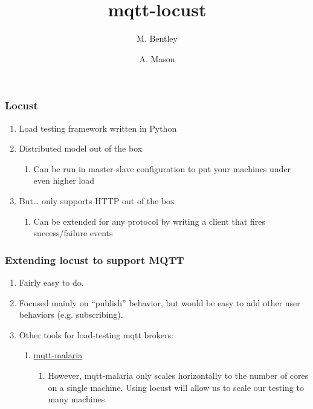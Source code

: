 \documentclass{beamer}
\title{mqtt-locust}
\author[Bentley, Mason]
{
    M. Bentley \and A. Mason\\
    \email{\{void,null\}@case.edu}
}
\institute[CWRU]{Case Western Reserve University}
\begin{document}
\frame{\titlepage}

\begin{frame}
    \frametitle{Locust}
    \begin{enumerate}
        \item Load testing framework written in Python
        \item
            Distributed model out of the box
            \begin{enumerate}
                \item Can be run in master-slave configuration to put your
                machines under even higher load
            \end{enumerate}
        \item
            But… only supports HTTP out of the box
            \begin{enumerate}
                \item Can be extended for any protocol by writing a client that
                fires success/failure events
            \end{enumerate}
    \end{enumerate}
\end{frame}

\begin{frame}
    \frametitle{Extending locust to support MQTT}
    \begin{enumerate}
        \item Fairly easy to do.
        \item Focused mainly on ``publish'' behavior, but would be easy to add
        other user behaviors (e.g. subscribing).
        \item
            Other tools for load-testing mqtt brokers:
            \begin{enumerate}
                \item
                    \href{https://github.com/leandog/mqtt-malaria}{mqtt-malaria}
                    \begin{enumerate}
                        \item However, mqtt-malaria only scales horizontally to
                        the number of cores on a single machine. Using locust
                        will allow us to scale our testing to many machines.
                    \end{enumerate}
            \end{enumerate}
    \end{enumerate}
\end{frame}
\end{document}
